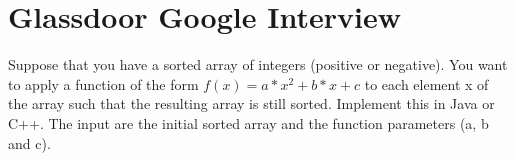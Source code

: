 \chapter{Glassdoor Google Interview}
\begin{problem}
Suppose that you have a sorted array of integers (positive or negative). You want to apply a function of the form $f(x) = a * x^2 + b * x + c$ to each element x of the array such that the resulting array is still sorted. Implement this in Java or C++. The input are the initial sorted array and the function parameters (a, b and c). 
\end{problem}	

\begin{solution}



\end{solution}	